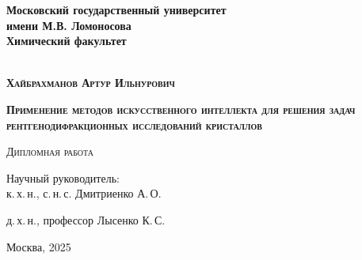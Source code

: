 \begin{titlepage}
\newpage

\begin{center}

\textbf{Московский государственный университет\\ имени М.В. Ломоносова}\\
\textbf{Химический факультет}\\
\\
\end{center}
\vspace{1cm}


\vspace{8em}
\begin{center}
\textsc{\textbf{Хайбрахманов Артур Ильнурович}}
\vspace{1cm}


\textsc{\textbf{\large Применение методов искусственного интеллекта для решения задач рентгенодифракционных исследований кристаллов}}


\vspace{1em}

\textsc{Дипломная работа}
\end{center}
\vspace{7em}
\begin{flushright}
Научный руководитель:\\

к.\,х.\,н., с.\,н.\,с. Дмитриенко А.\,О.

д.\,х.\,н., профессор Лысенко К.\,С.

\end{flushright}

\vspace{\fill}

\begin{center}
Москва, 2025
\end{center}

\end{titlepage}
